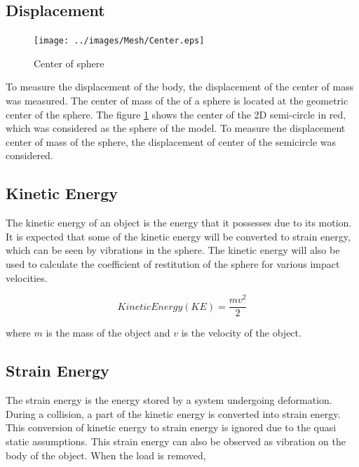 \subsection{Displacement}

\begin{figure}
  \begin{center}
	\texttt{[image: ../images/Mesh/Center.eps]}
  \end{center}
  \caption{Center of sphere}
  \label{fig:center}
\end{figure}

To measure the displacement of the body, the displacement of the center of mass was measured. The center of mass of the of a sphere is located at the geometric center of the sphere. The figure \ref{fig:center} shows the center of the 2D semi-circle in red, which was considered as the sphere of the model. To measure the displacement center of mass of the sphere, the displacement of center of the semicircle was considered.

\subsection{Kinetic Energy}

The kinetic energy of an object is the energy that it possesses due to its motion. It is expected that some of the kinetic energy will be converted to strain energy, which can be seen by vibrations in the sphere. The kinetic energy will also be used to calculate the coefficient of restitution of the sphere for various impact velocities.

\begin{equation}
Kinetic Energy(KE) = \frac{mv^{2}}{2}
\end{equation}
 
where $m$ is the mass of the object and $v$ is the velocity of the object.

\subsection{Strain Energy}

The strain energy is the energy stored by a system undergoing deformation. During a collision, a part of the kinetic energy is converted into strain energy. This conversion of kinetic energy to strain energy is ignored due to the quasi static assumptions. This strain energy can also be observed as vibration on the body of the object. When the load is removed,

